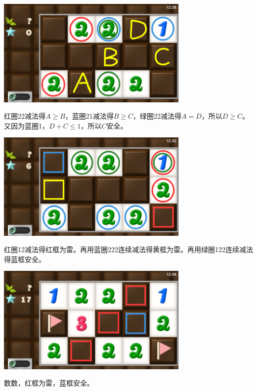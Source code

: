 \subsection{} %
\begin{center}
    \includegraphics[width=0.7\textwidth]{puzzle/84-1.png}
\end{center}
红圈22减法得$A\ge B$，蓝圈21减法得$B\ge C$，绿圈22减法得$A=D$，所以$D\ge C$。又因为蓝圈1，$D+C\le 1$，所以$C$安全。
\begin{center}
    \includegraphics[width=0.7\textwidth]{puzzle/84-2.png}
\end{center}
红圈12减法得红框为雷。再用蓝圈222连续减法得黄框为雷。再用绿圈122连续减法得蓝框安全。
\begin{center}
    \includegraphics[width=0.7\textwidth]{puzzle/84-3.png}
\end{center}
数数，红框为雷，蓝框安全。


